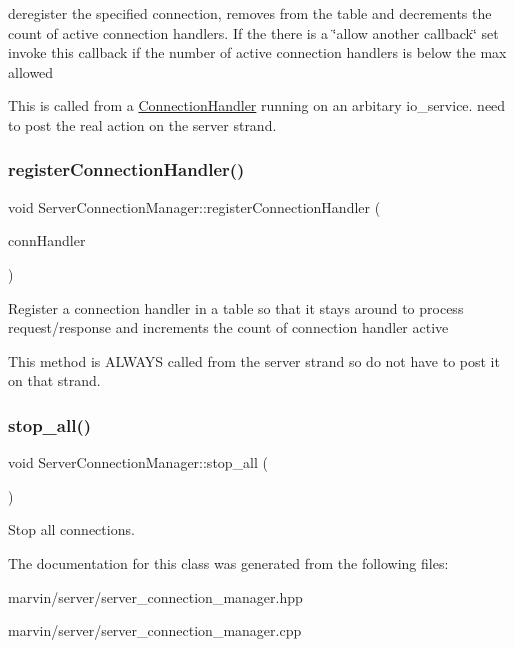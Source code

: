 deregister the specified connection, removes from the table and decrements the count of active connection handlers. If the there is a \char`\"{}allow another callback\char`\"{} set invoke this callback if the number of active connection handlers is below the max allowed

This is called from a \hyperlink{class_connection_handler}{Connection\+Handler} running on an arbitary io\+\_\+service. need to post the real action on the server strand. \mbox{\label{class_server_connection_manager_aa2c03c50b5154af1424ed92a35cd6389}} 
\subsubsection{\texorpdfstring{register\+Connection\+Handler()}{registerConnectionHandler()}}
{\footnotesize\ttfamily void Server\+Connection\+Manager\+::register\+Connection\+Handler (\begin{DoxyParamCaption}\item[{\hyperlink{class_connection_handler}{Connection\+Handler} $\ast$}]{conn\+Handler }\end{DoxyParamCaption})}

Register a connection handler in a table so that it stays around to process request/response and increments the count of connection handler active

This method is A\+L\+W\+A\+YS called from the server strand so do not have to post it on that strand. \mbox{\label{class_server_connection_manager_a83a3b22ce780b4762ad06e7f2ffbb611}} 
\subsubsection{\texorpdfstring{stop\+\_\+all()}{stop\_all()}}
{\footnotesize\ttfamily void Server\+Connection\+Manager\+::stop\+\_\+all (\begin{DoxyParamCaption}{ }\end{DoxyParamCaption})}

Stop all connections. 

The documentation for this class was generated from the following files\+:\begin{DoxyCompactItemize}
\item 
marvin/server/server\+\_\+connection\+\_\+manager.\+hpp\item 
marvin/server/server\+\_\+connection\+\_\+manager.\+cpp\end{DoxyCompactItemize}
